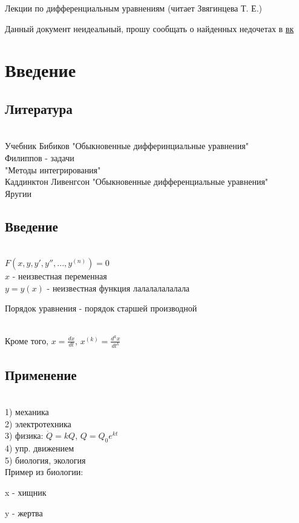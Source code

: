 \documentclass[11pt]{article}
\begin{document}
\begin{center}
  \huge Лекции по дифференциальным уравнениям
  (читает Звягинцева Т. Е.)
\end{center}
Данный документ неидеальный, прошу сообщать о найденных недочетах в \href{https://vk.com/drab_existence_a}{вк}
\tableofcontents
\newpage

\section{Введение}
\subsection{Литература}\ \\
Учебник Бибиков "Обыкновенные дифферинциальные уравнения"\\
Филиппов - задачи\\
"Методы интегрирования"\\
Каддинктон Ливенгсон "Обыкновенные дифференциальные уравнения"\\
Яругии
\\
\subsection{Введение}\ \\
$F(x,y,y',y'',...,y^{(n)})=0$\\
$x$ - неизвестная переменная\\
$y=y(x)$ - неизвестная функция лалалалалалала

\begin{definition}
Порядок уравнения - порядок старшей производной
\end{definition}
\\
Кроме того, $x= \frac{dx}{dt}$, $x^{(k)}= \frac{d^k x}{dt^k}$
\\
\subsection{Применение}\ \\
1) механика\\
2) электротехника\\
3) физика: $\dot{Q}=k Q$, $Q=Q_0 e^{kt}$\\
4) упр. движением\\
5) биология, экология\\
Пример из биологии:

x - хищник

y - жертва
\end{document}
